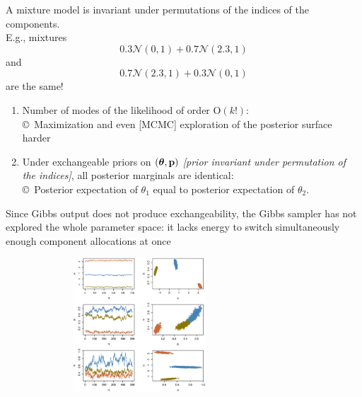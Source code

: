 \begin{slide}
A mixture model is invariant under
permutations of the indices of the components.\\

E.g., mixtures 
$$
0.3\mathscr{N}(0,1)+0.7\mathscr{N}(2.3,1)
$$
and
$$
0.7\mathscr{N}(2.3,1)+0.3\mathscr{N}(0,1)
$$
are  the same!

\vs\pause
{}

\end{slide}\begin{slide}

\begin{enumerate}
\item Number of modes of the likelihood of order $\mathrm{O}(k!)$:\\
\copyright~Maximization and even [MCMC] exploration of the posterior surface harder 

\pause
\item Under exchangeable priors on $(\mbox{\boldmath{$\theta$}},\mathbf{p})$
{\em [prior invariant under permutation of the indices]}, all 
posterior marginals are identical:\\
\copyright~Posterior expectation of $\theta_1$ equal to posterior expectation of $\theta_2$.
\end{enumerate}

\end{slide}\begin{slide}

Since Gibbs output does not produce exchangeability, the Gibbs sampler has not explored the
whole parameter space: it lacks energy to switch simultaneously enough component allocations 
at once

\centerline{\includegraphics[height=5cm,width=10cm]{figures/mixt.noX.eps}}

\end{slide}\begin{slide}


\end{slide}
